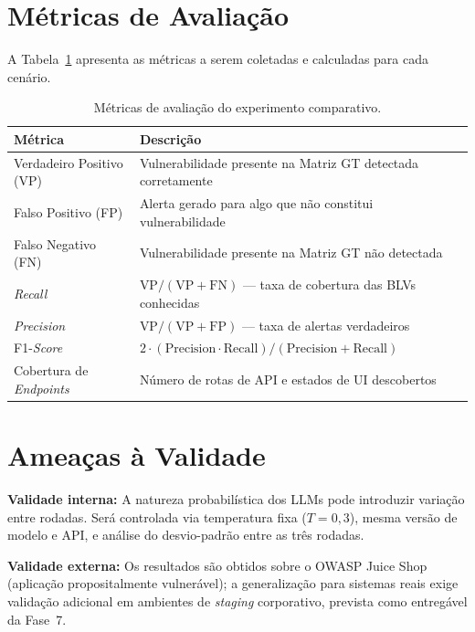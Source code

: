 \documentclass[
    12pt,
    openany,
    oneside,
    a4paper,
    brazil
]{abntex2}
\begin{document}
\section{Métricas de Avaliação}

A Tabela~\ref{tab:metricas} apresenta as métricas a serem coletadas e
calculadas para cada cenário.

\begin{table}[htb]
\centering
\caption{Métricas de avaliação do experimento comparativo.%
\label{tab:metricas}}
\begin{tabularx}{\textwidth}{lX}
\toprule
\textbf{Métrica} & \textbf{Descrição} \\
\midrule
Verdadeiro Positivo (VP) &
  Vulnerabilidade presente na Matriz GT detectada corretamente \\[2pt]
Falso Positivo (FP) &
  Alerta gerado para algo que não constitui vulnerabilidade \\[2pt]
Falso Negativo (FN) &
  Vulnerabilidade presente na Matriz GT não detectada \\[2pt]
\textit{Recall} &
  $\text{VP} / (\text{VP} + \text{FN})$ --- taxa de cobertura das BLVs
  conhecidas \\[2pt]
\textit{Precision} &
  $\text{VP} / (\text{VP} + \text{FP})$ --- taxa de alertas verdadeiros
  \\[2pt]
F1-\textit{Score} &
  $2 \cdot (\text{Precision} \cdot \text{Recall}) /
  (\text{Precision} + \text{Recall})$ \\[2pt]
Cobertura de \textit{Endpoints} &
  Número de rotas de API e estados de UI descobertos \\
\bottomrule
\end{tabularx}
\end{table}

\section{Ameaças à Validade}

\textbf{Validade interna:} A natureza probabilística dos LLMs pode
introduzir variação entre rodadas. Será controlada via temperatura fixa
($T = 0{,}3$), mesma versão de modelo e API, e análise do
desvio-padrão entre as três rodadas.

\textbf{Validade externa:} Os resultados são obtidos sobre o OWASP
Juice Shop (aplicação propositalmente vulnerável); a generalização para
sistemas reais exige validação adicional em ambientes de
\textit{staging} corporativo, prevista como entregável da Fase~7.
\end{document}
